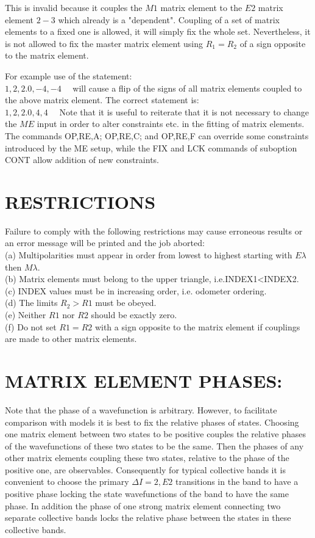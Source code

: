 \documentclass[10pt]{article}
\begin{document}
This is invalid because it couples the $M 1$ matrix element to the $E 2$ matrix element $2-3$ which already is a "dependent". Coupling of a set of matrix elements to a fixed one is allowed, it will simply fix the whole set. Nevertheless, it is not allowed to fix the master matrix element using $R_{1}=R_{2}$ of a sign opposite to the matrix element.

For example use of the statement:\\
$1,2,2.0,-4,-4 \quad$ will cause a flip of the signs of all matrix elements coupled to the above matrix element. The correct statement is:\\
$1,2,2.0,4,4 \quad$ Note that it is useful to reiterate that it is not necessary to change the $M E$ input in order to alter constraints etc. in the fitting of matrix elements. The commands OP,RE,A; OP,RE,C; and OP,RE,F can override some constraints introduced by the ME setup, while the FIX and LCK commands of suboption CONT allow addition of new constraints.

\section*{RESTRICTIONS}
Failure to comply with the following restrictions may cause erroneous results or an error message will be printed and the job aborted:\\
(a) Multipolarities must appear in order from lowest to highest starting with $E \lambda$ then $M \lambda$.\\
(b) Matrix elements must belong to the upper triangle, i.e.INDEX1<INDEX2.\\
(c) INDEX values must be in increasing order, i.e. odometer ordering.\\
(d) The limits $R_{2}>R 1$ must be obeyed.\\
(e) Neither $R 1$ nor $R 2$ should be exactly zero.\\
(f) Do not set $R 1=R 2$ with a sign opposite to the matrix element if couplings are made to other matrix elements.

\section*{MATRIX ELEMENT PHASES:}
Note that the phase of a wavefunction is arbitrary. However, to facilitate comparison with models it is best to fix the relative phases of states. Choosing one matrix element between two states to be positive couples the relative phases of the wavefunctions of these two states to be the same. Then the phases of any other matrix elements coupling these two states, relative to the phase of the positive one, are observables. Consequently for typical collective bands it is convenient to choose the primary $\Delta I=2, E 2$ transitions in the band to have a positive phase locking the state wavefunctions of the band to have the same phase. In addition the phase of one strong matrix element connecting two separate collective bands locks the relative phase between the states in these collective bands.
\end{document}
